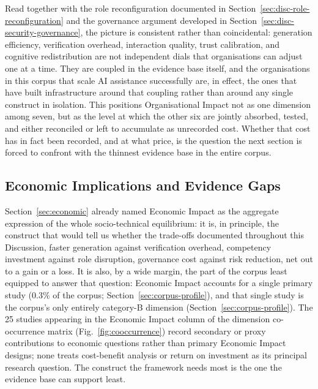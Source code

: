 Read together with the role reconfiguration documented in Section~\ref{sec:disc-role-reconfiguration} and the governance argument developed in Section~\ref{sec:disc-security-governance}, the picture is consistent rather than coincidental: generation efficiency, verification overhead, interaction quality, trust calibration, and cognitive redistribution are not independent dials that organisations can adjust one at a time. They are coupled in the evidence base itself, and the organisations in this corpus that scale AI assistance successfully are, in effect, the ones that have built infrastructure around that coupling rather than around any single construct in isolation. This positions Organisational Impact not as one dimension among seven, but as the level at which the other six are jointly absorbed, tested, and either reconciled or left to accumulate as unrecorded cost. Whether that cost has in fact been recorded, and at what price, is the question the next section is forced to confront with the thinnest evidence base in the entire corpus.

\subsection{Economic Implications and Evidence Gaps}
\label{sec:disc-economic-gaps}
Section~\ref{sec:economic} already named Economic Impact as the aggregate expression of the whole socio-technical equilibrium: it is, in principle, the construct that would tell us whether the trade-offs documented throughout this Discussion, faster generation against verification overhead, competency investment against role disruption, governance cost against risk reduction, net out to a gain or a loss. It is also, by a wide margin, the part of the corpus least equipped to answer that question: Economic Impact accounts for a single primary study (0.3\% of the corpus; Section~\ref{sec:corpus-profile}), and that single study is the corpus's only entirely category-B dimension (Section~\ref{sec:corpus-profile}). The 25 studies appearing in the Economic Impact column of the dimension co-occurrence matrix (Fig.~\ref{fig:cooccurrence}) record secondary or proxy contributions to economic questions rather than primary Economic Impact designs; none treats cost-benefit analysis or return on investment as its principal research question. The construct the framework needs most is the one the evidence base can support least.

